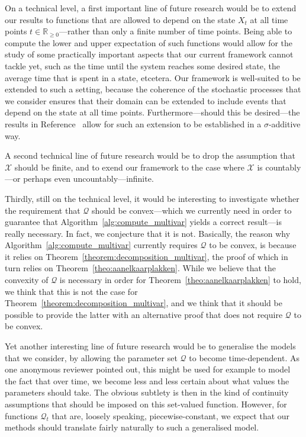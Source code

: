 \documentclass[10pt,a4paper]{paper}
\theoremstyle{definition}
\newcommand{\reals}{\mathbb{R}}
\newcommand{\realsnonneg}{\reals_{\geq 0}}
\newcommand{\states}{\mathcal{X}}
\newcommand{\rateset}{\mathcal{Q}}
\begin{document}
On a technical level, a first important line of future research would be to extend our results to functions that are allowed to depend on the state $X_t$ at all time points $t\in\realsnonneg$---rather than only a finite number of time points. Being able to compute the lower and upper expectation of such functions would allow for the study of some practically important aspects that our current framework cannot tackle yet, such as the time until the system reaches some desired state, the average time that is spent in a state, etcetera. 
Our framework is well-suited to be extended to such a setting, because the coherence of the stochastic processes that we consider ensures that their domain can be extended to include events that depend on the state at all time points. Furthermore---should this be desired---the results in Reference~\cite{berti2002coherent} allow for such an extension to be established in a $\sigma$-additive way. 

A second technical line of future research would be to drop the assumption that $\states$ should be finite, and to exend our framework to the case where $\states$ is countably---or perhaps even uncountably---infinite.

Thirdly, still on the technical level, it would be interesting to investigate whether the requirement that $\rateset$ should be convex---which we currently need in order to guarantee that Algorithm~\ref{alg:compute_multivar} yields a correct result---is really necessary. In fact, we conjecture that it is not. Basically, the reason why Algorithm~\ref{alg:compute_multivar} currently requires $\rateset$ to be convex, is because it relies on Theorem~\ref{theorem:decomposition_multivar}, the proof of which in turn relies on Theorem~\ref{theo:aanelkaarplakken}. While we believe that the convexity of $\rateset$ is necessary in order for Theorem~\ref{theo:aanelkaarplakken} to hold, we think that this is not the case for Theorem~\ref{theorem:decomposition_multivar}, and we think that it should be possible to provide the latter with an alternative proof that does not require $\rateset$ to be convex. 

Yet another interesting line of future research would be to generalise the models that we consider, by allowing the parameter set $\rateset$ to become time-dependent. As one anonymous reviewer pointed out, this might be used for example to model the fact that over time, we become less and less certain about what values the parameters should take. The obvious subtlety is then in the kind of continuity assumptions that should be imposed on this set-valued function. However, for functions $\rateset_t$ that are, loosely speaking, piecewise-constant, we expect that our methods should translate fairly naturally to such a generalised model. 
\end{document}

